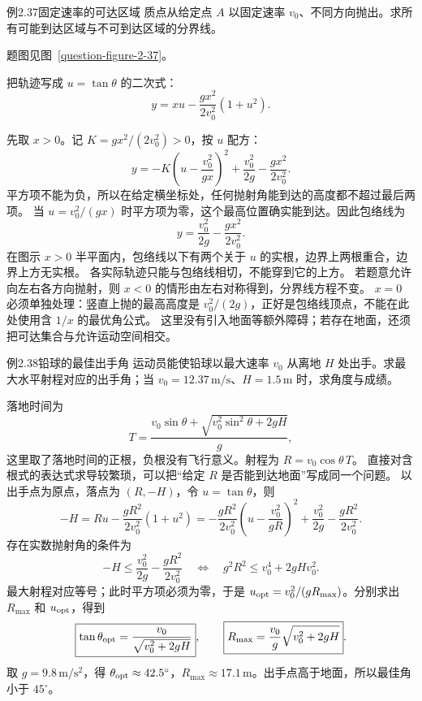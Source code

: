 \begin{origexamplebox}{例2.37\quad 固定速率的可达区域}
质点从给定点 $A$ 以固定速率 $v_0$、不同方向抛出。求所有可能到达区域与不可到达区域的分界线。
\par 题图见图~\ref{question-figure-2-37}。
\KQuestionBL
\end{origexamplebox}
\begin{xesolution}
把轨迹写成 $u=\tan\theta$ 的二次式：
\[
y=xu-\frac{gx^2}{2v_0^2}(1+u^2).
\]
\ProjectileReachabilityDiagram

先取 $x>0$。记 $K=gx^2/(2v_0^2)>0$，按 $u$ 配方：
\[
 y=-K\left(u-\frac{v_0^2}{gx}\right)^2
    +\frac{v_0^2}{2g}-\frac{gx^2}{2v_0^2}.
\]
平方项不能为负，所以在给定横坐标处，任何抛射角能到达的高度都不超过最后两项。
当 $u=v_0^2/(gx)$ 时平方项为零，这个最高位置确实能到达。因此包络线为
\[
 \boxed{y=\frac{v_0^2}{2g}-\frac{gx^2}{2v_0^2}}.
\]
在图示 $x>0$ 半平面内，包络线以下有两个关于 $u$ 的实根，边界上两根重合，边界上方无实根。
各实际轨迹只能与包络线相切，不能穿到它的上方。
若题意允许向左右各方向抛射，则 $x<0$ 的情形由左右对称得到，分界线方程不变。
$x=0$ 必须单独处理：竖直上抛的最高高度是 $v_0^2/(2g)$，正好是包络线顶点，不能在此处使用含 $1/x$ 的最优角公式。
这里没有引入地面等额外障碍；若存在地面，还须把可达集合与允许运动空间相交。
\end{xesolution}

\ifdefined\Needspace{}\fi
\begin{origexamplebox}{例2.38\quad 铅球的最佳出手角}
运动员能使铅球以最大速率 $v_0$ 从离地 $H$ 处出手。求最大水平射程对应的出手角；当 $v_0=12.37\,\mathrm{m/s}$、$H=1.5\,\mathrm m$ 时，求角度与成绩。
\end{origexamplebox}
\begin{xesolution}
落地时间为
\[
T=\frac{v_0\sin\theta+\sqrt{v_0^2\sin^2\theta+2gH}}{g},
\]
这里取了落地时间的正根，负根没有飞行意义。射程为 $R=v_0\cos\theta\,T$。
直接对含根式的表达式求导较繁琐，可以把“给定 $R$ 是否能到达地面”写成同一个问题。
以出手点为原点，落点为 $(R,-H)$，令 $u=\tan\theta$，则
\[
 -H=Ru-\frac{gR^2}{2v_0^2}(1+u^2)
 =-\frac{gR^2}{2v_0^2}
   \left(u-\frac{v_0^2}{gR}\right)^2
   +\frac{v_0^2}{2g}-\frac{gR^2}{2v_0^2}.
\]
存在实数抛射角的条件为
\[
 -H\le\frac{v_0^2}{2g}-\frac{gR^2}{2v_0^2}
 \quad\Longleftrightarrow\quad
 g^2R^2\le v_0^4+2gHv_0^2.
\]
最大射程对应等号；此时平方项必须为零，于是
$u_{\rm opt}=v_0^2/(gR_{\max})$。分别求出 $R_{\max}$ 和 $u_{\rm opt}$，得到
\[
 \boxed{\tan\theta_{\rm opt}=\frac{v_0}{\sqrt{v_0^2+2gH}}},
 \qquad
 \boxed{R_{\max}=\frac{v_0}{g}\sqrt{v_0^2+2gH}}.
\]
取 $g=9.8\,\mathrm{m/s^2}$，得 $\theta_{\rm opt}\approx42.5^\circ$，$R_{\max}\approx17.1\,\mathrm m$。出手点高于地面，所以最佳角小于 $45^\circ$。
\end{xesolution}


